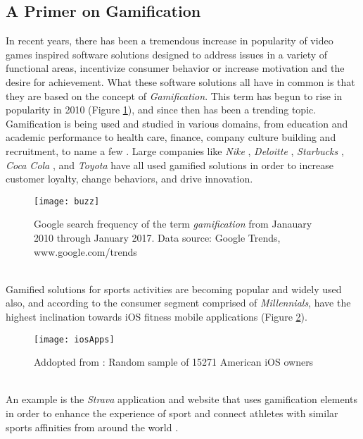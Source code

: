\subsection{A Primer on Gamification}
In recent years, there has been a tremendous increase in popularity of video games inspired software solutions designed to address issues in a variety of functional areas, incentivize consumer behavior or increase motivation and the desire for achievement. What these software solutions all have in common is that they are based on the concept of \textit{Gamification}. This term has begun to rise in popularity in 2010 (Figure \ref{fig:buzz}), and since then has been a trending topic. %
Gamification is being used and studied in various domains, from education and academic performance to health care, finance, company culture building and recruitment, to name a few \cite{gamificationExamples, gamificationWiki, enterpriseGamify}. Large companies like \textit{Nike} \cite{nikePlus}, \textit{Deloitte} \cite{deloitte}, \textit{Starbucks} \cite{starbucks}, \textit{Coca Cola} \cite{coke}, and \textit{Toyota} \cite{toyota} have all used gamified solutions in order to increase customer loyalty, change behaviors, and drive innovation. \pagebreak 
\begin{figure}[h]
    \centering
    \texttt{[image: buzz]}
    \caption{Google search frequency of the term \textit{gamification} from Janauary 2010 through January 2017. Data source: Google Trends, www.google.com/trends}
    \label{fig:buzz}
\end{figure}\\
Gamified solutions for sports activities are becoming popular and widely used also, and according to \cite{iosPopulatity} the consumer segment comprised of \textit{Millennials}, have the highest inclination towards iOS fitness mobile applications (Figure \ref{fig:iosApps}). 
\begin{figure}[h]
    \centering
    \texttt{[image: iosApps]}
    \caption{Addopted from \cite{iosPopulatity}: Random sample of 15271 American iOS owners}
    \label{fig:iosApps}
\end{figure}\\
An example is the \textit{Strava} application and website that uses gamification elements in order to enhance the experience of sport and connect athletes with similar sports affinities from around the world \cite{strava}. %
